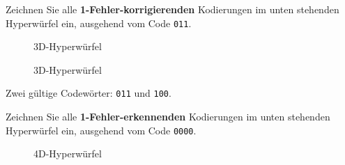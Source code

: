 \begin{myexercise}
Zeichnen Sie alle \textbf{1-Fehler-korrigierenden} Kodierungen im unten stehenden Hyperwürfel ein, ausgehend vom Code \texttt{011}.
\begin{figure}[H]
\centering
{}
\caption{3D-Hyperwürfel}
\end{figure}


\begin{myanswer}

\begin{figure}[H]
\centering
{}
\caption{3D-Hyperwürfel}
\end{figure}
Zwei gültige Codewörter: \texttt{011} und \texttt{100}.
\end{myanswer}

\end{myexercise}

\begin{myexercise}
Zeichnen Sie alle \textbf{1-Fehler-erkennenden} Kodierungen im unten stehenden Hyperwürfel ein, ausgehend vom Code \texttt{0000}.
\begin{figure}[H]
\centering
{}
\caption{4D-Hyperwürfel}
\end{figure}


\begin{myanswer}

\begin{figure}[H]
\centering
{}
\end{figure}
\end{myanswer}
\end{myexercise}

